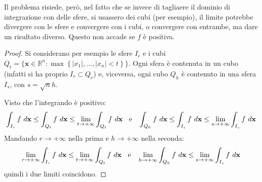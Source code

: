 \documentclass[10pt, a4paper]{scrartcl}
\theoremstyle{definition}
\numberwithin{esempio}{section}
\theoremstyle{definition}
\numberwithin{obs}{section}
\numberwithin{nota}{section}
\numberwithin{equation}{subsection}
\begin{document}
Il problema risiede, per\`o, nel fatto che se invece di tagliaere il dominio di integrazione con delle sfere, si usassero dei cubi (per esempio), il limite potrebbe divergere con le sfere e convergere con i cubi, o convergere con entrambe, ma dare un risultato diverso. 
Questo non accade se $f$ \`e positiva. 
\begin{proof}
	Si considerano per esempio le sfere $I_r$ e i cubi $Q_t = \big\{ \mathbf{x} \in \mathbb{R}^n : \max \left\{ \lvert x_1 \rvert , \ldots, \lvert  x_n\rvert < t \right\}  \big\} $. 
	Ogni sfera \`e contenuta in un cubo (infatti si ha proprio $I_r \subset Q_r$) e, viceversa, ogni cubo $Q_h$ \`e contenuto in una sfera $I_s$, con $s= \sqrt{n} h$.

	Visto che l'integrando \`e positivo:
	\[
	\int_{I_r} f \ d\mathbf{x} \le \int_{Q_t} f \ d\mathbf{x} \le \lim_{t \to +\infty} \int_{Q_t} f \ d\mathbf{x} \hspace{.2cm} \text{ e } \hspace{.2cm}\int_{Q_h} f \ d\mathbf{x} \le \int_{I_s} f \ d\mathbf{x} \le \lim_{s \to +\infty} \int_{I_s} f \ d\mathbf{x} 
	\] 
Mandando $r\to+\infty$ nella prima e $h\to+\infty$ nella seconda:	
\[
\lim_{r \to +\infty} \int_{I_r} f \ d\mathbf{x} \le \lim_{t \to +\infty} \int_{Q_t} f \ d\mathbf{x} \hspace{.2cm} \text{ e } \hspace{.2cm} \lim_{h \to +\infty} \int_{Q_h} f \ d \mathbf{x} \le \lim_{s \to +\infty} \int_{I_s} f \ d\mathbf{x} 
\]
quindi i due limiti coincidono. 
\end{proof}
\end{document}
